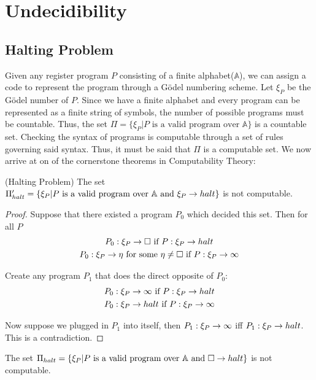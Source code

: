 \documentclass[main.tex]{subfiles}
\begin{document}
\section{Undecidibility}

\subsection{Halting Problem}
Given any register program $P$ consisting of a finite alphabet($\mathbb{A}$), we can assign a code to represent the program through a G\"{o}del numbering scheme. Let $\xi_P$ be the G\"{o}del number of $P$.
Since we have a finite alphabet and every program can be represented as a finite string of symbols, the number of possible programs must be countable. Thus, the set 
$\Pi = \{\xi_P \vert \text{$P$ is a valid program over $\mathbb{A}$}\}$ is a countable set. Checking the syntax of programs is computable through a set of rules governing said syntax. Thus, it must be said that
$\Pi$ is a computable set. We now arrive at on of the cornerstone theorems in Computability Theory:

\begin{theorem}
 (Halting Problem) \n
 The set $\Pi_{halt}' = \{\xi_P \vert \text{$P$ is a valid program over $\mathbb{A}$ and $\xi_P \rightarrow halt$}\}$ is not computable.
\end{theorem}

\begin{proof}
 Suppose that there existed a program $P_0$ which decided this set.  Then for all $P$
 \begin{gather*}
  P_0: \xi_P \rightarrow\square \text{ if } P: \xi_P \rightarrow halt \\
  P_0: \xi_P  \rightarrow \eta \text{ for some $\eta \neq \square $ if } P: \xi_P \rightarrow \infty
 \end{gather*}

 Create any program $P_1$ that does the direct opposite of $P_0$:
 \begin{gather*}
  P_0: \xi_P \rightarrow\infty \text{ if } P: \xi_P \rightarrow halt \\
P_0: \xi_P \rightarrow halt \text{ if } P: \xi_P \rightarrow \infty
\end{gather*}

 Now suppose we plugged in $P_1$ into itself, then 
 $P_1:\xi_P \rightarrow\infty $ iff $P_1:\xi_P \rightarrow halt$. This is a contradiction.
\end{proof}

\begin{lemma}
The set $\Pi_{halt} = \{\xi_P \vert \text{$P$ is a valid program over $\mathbb{A}$ and $\square \rightarrow halt$}\}$ is not computable.
\end{lemma}
\end{document}
